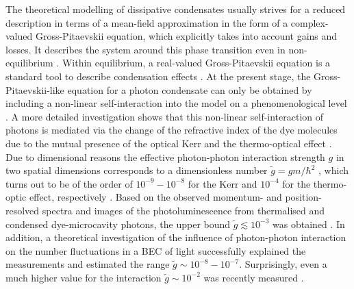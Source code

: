 \documentclass[12pt, a4paper]{iopart}
\begin{document}
The theoretical modelling of dissipative condensates usually strives for a reduced description in terms of a mean-field approximation in the form of a complex-valued Gross-Pitaevskii equation, which explicitly takes into account gains and losses. It describes the system around this phase transition even in non-equilibrium
\cite{Wouters-noneq-BEC-of_exciton,Lagoudakis-votices_in_excition_condensate,Bobrovska_Polariton_condensate-coherence}.
Within equilibrium, a real-valued Gross-Pitaevskii equation is a standard tool to describe condensation effects 
\cite{Pitaevskii-BEC,Pethick-Smith,Gross-Structure_quantized_vortex_boson_systems,Pitaevskii-Vortex_imperfect_Bose_gas,Diver-BEC_chaotic_dynamics_optical_cavity,Chiocchetta-non-eq_condensate}. At the present stage, the Gross-Pitaevskii-like equation for a photon condensate can only be obtained by including a non-linear self-interaction into the model on a phenomenological level
\cite{Klaers_BEC_of_photons,PhotonBEC-theoretic_descrip_based_on_maxwell-Nyman,Chiocchetta-qm_langevin_noneq_photon_condens}. A more detailed investigation shows that this non-linear self-interaction of photons is mediated via the change of the refractive index of the dye molecules due to the mutual presence of the optical Kerr and the thermo-optical effect \cite{ApplPhys}. Due to dimensional reasons the effective photon-photon interaction strength $g$ in two spatial dimensions corresponds to a dimensionless number $\tilde{g}= g m / \hbar^2$ \cite{Dalibard}, which turns out to be of the order of $10^{-9} \!-\! 10^{-8}$ for the Kerr 
and $10^{-4}$ for the thermo-optic effect, respectively \cite{ApplPhys}. Based on the observed momentum- and position-resolved spectra and images of the photoluminescence from thermalised and condensed dye-microcavity photons, the upper bound  $\tilde{g}\lesssim 10^{-3}$ was obtained \cite{NymanStrength}. In addition, a theoretical investigation of the influence of photon-photon interaction on the number fluctuations in a BEC of light \cite{StoofPRL-Interaction} successfully explained the measurements \cite{PhotonBEC-Observation_of_statistics-Weitz} and estimated the range $\tilde{g}\sim 10^{-8}-10^{-7}$. Surprisingly, even a much higher value for the interaction $\tilde{g} \sim 10^{-2}$ was recently measured \cite{Oosten}.
\end{document}
